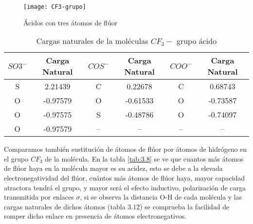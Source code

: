 \begin{figure}[H]
	\centering
	\texttt{[image: CF3-grupo]}
	\caption{Ácidos con tres átomos de flúor}
\end{figure}

\begin{table}[H]
    \centering
    \begin{tabular}{|c|c|c|c|c|c|}
    \hline
    $SO3^-$ & Carga Natural &$COS^-$ & Carga Natural & $COO^-$ & Carga Natural \\ \hline
    S & 2.21439 & C & 0.22678 & C & 0.68743 \\ \hline
    O & -0.97579 & O & -0.61533 & O & -0.73587 \\ \hline
    O & -0.97575 & S & -0.48786 & O & -0.74097 \\ \hline
    O & -0.97579 & -- & -- & -- & -- \\ \hline
    \end{tabular}
    \caption{Cargas naturales de la moléculas $CF_3-$ grupo ácido}
\end{table}

Comparamos también sustitución de átomos de flúor por átomos de hidrógeno en el grupo $CF_3$ de la molécula. En la tabla \ref{tab:3.8} se ve que cuantos más átomos de flúor haya en la molécula mayor es su acidez, esto se debe a la elevada electronegatividad del flúor, cuántos más átomos de flúor haya, mayor capacidad atractora tendrá el grupo, y mayor será el efecto inductivo, polarización de carga transmitida por enlaces $\sigma$, si se observa la distancia O-H de cada molécula y las cargas naturales de dichos átomos (tabla 3.12) se comprueba la facilidad de romper dicho enlace en presencia de átomos electronegativos.

